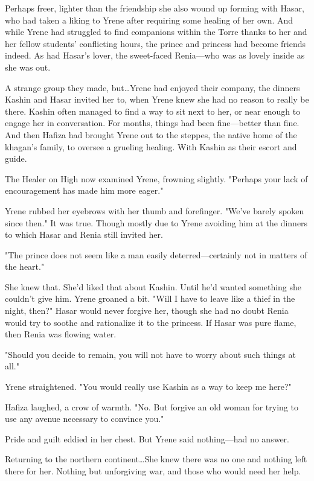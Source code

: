Perhaps freer, lighter than the friendship she also wound up forming with Hasar, who had taken a liking to Yrene after requiring some healing of her own.
And while Yrene had struggled to find companions within the Torre thanks to her and her fellow students' conflicting hours, the prince and princess had become friends indeed.
As had Hasar's lover, the sweet-faced Renia---who was as lovely inside as she was out.

A strange group they made, but\ldots Yrene had enjoyed their company, the dinners Kashin and Hasar invited her to, when Yrene knew she had no reason to really be there.
Kashin often managed to find a way to sit next to her, or near enough to engage her in conversation.
For months, things had been fine---better than fine.
And then Hafiza had brought Yrene out to the steppes, the native home of the khagan's family, to oversee a grueling healing.
With Kashin as their escort and guide.

The Healer on High now examined Yrene, frowning slightly.
"Perhaps your lack of encouragement has made him more eager."

Yrene rubbed her eyebrows with her thumb and forefinger.
"We've barely spoken since then."
It was true.
Though mostly due to Yrene avoiding him at the dinners to which Hasar and Renia still invited her.

"The prince does not seem like a man easily deterred---certainly not in matters of the heart."

She knew that.
She'd liked that about Kashin.
Until he'd wanted something she couldn't give him.
Yrene groaned a bit.
"Will I have to leave like a thief in the night, then?"
Hasar would never forgive her, though she had no doubt Renia would try to soothe and rationalize it to the princess.
If Hasar was pure flame, then Renia was flowing water.

"Should you decide to remain, you will not have to worry about such things at all."

Yrene straightened.
"You would really use Kashin as a way to keep me here?"

Hafiza laughed, a crow of warmth.
"No.
But forgive an old woman for trying to use any avenue necessary to convince you."

Pride and guilt eddied in her chest.
But Yrene said nothing---had no answer.

Returning to the northern continent\ldots She knew there was no one and nothing left there for her.
Nothing but unforgiving war, and those who would need her help.

